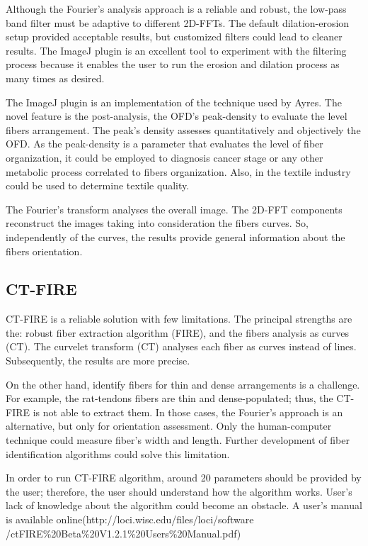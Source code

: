 \documentclass[12pt,a4paper]{article}
\begin{document}
Although the Fourier's analysis approach is a reliable and robust, the low-pass band filter must be adaptive to different 2D-FFTs. The default dilation-erosion setup provided acceptable results, but customized filters could lead to cleaner results. The ImageJ plugin is an excellent tool to experiment with the filtering process because it enables the user to run the erosion and dilation process as many times as desired. 

The ImageJ plugin is an implementation of the technique used by Ayres. The novel feature is the post-analysis, the OFD's peak-density to evaluate the level fibers arrangement. The peak's density assesses quantitatively and objectively the OFD. As the peak-density is a parameter that evaluates the level of fiber organization, it could be employed to diagnosis cancer stage or any other metabolic process correlated to fibers organization. Also, in the textile industry could be used to determine textile quality.

The Fourier's transform analyses the overall image. The 2D-FFT components reconstruct the images taking into consideration the fibers curves. So, independently of the curves, the results provide general information about the fibers orientation.

\subsection{CT-FIRE}
CT-FIRE is a reliable solution with few limitations. The principal strengths are the: robust fiber extraction algorithm (FIRE), and the fibers analysis as curves (CT). The curvelet transform (CT) analyses each fiber as curves instead of lines. Subsequently, the results are more precise.

On the other hand, identify fibers for thin and dense arrangements is a challenge. For example, the rat-tendons fibers are thin and dense-populated; thus, the CT-FIRE is not able to extract them. In those cases, the Fourier's approach is an alternative, but only for orientation assessment. Only the human-computer technique could measure fiber's width and length. Further development of fiber identification algorithms could solve this limitation. 

In order to run CT-FIRE  algorithm, around 20 parameters should be provided by the user; therefore, the user should understand how the algorithm works. User's lack of knowledge about the algorithm could become an obstacle. A user's manual is available online(http://loci.wisc.edu/files/loci/software /ctFIRE\%20Beta\%20V1.2.1\%20Users\%20Manual.pdf) 
\end{document}
